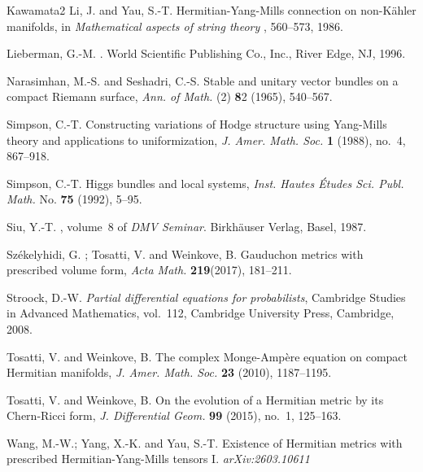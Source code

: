 \documentclass[12pt, reqno]{amsart}
\theoremstyle{plain}
\theoremstyle{definition}
\renewcommand{\>}{\rightarrow}
\renewcommand{\>}{\rightarrow}
\numberwithin{equation}{section} %
\begin{document}
\begin{thebibliography}{Kawamata2}
Li, J. and Yau, S.-T.  Hermitian-Yang-Mills connection on non-K\"ahler manifolds, in {\it Mathematical aspects of string theory }, 560--573, 1986.

 Lieberman, G.-M.
    .
    \newblock World Scientific Publishing Co., Inc., River Edge, NJ, 1996.





    Narasimhan, M.-S.  and  Seshadri, C.-S.  Stable and unitary vector bundles on a compact Riemann surface,  \emph{Ann. of Math.} (2) {\textbf 82} (1965), 540--567.




     Simpson, C.-T.  Constructing variations of Hodge structure using Yang-Mills theory and applications to uniformization, \emph{J. Amer. Math. Soc.} {\textbf 1} (1988), no.~4, 867--918.

     Simpson, C.-T.  Higgs bundles and local systems,  \emph{Inst. Hautes \'Etudes Sci. Publ. Math.} No. \textbf{75} (1992), 5--95.




Siu, Y.-T.
    , volume~8 of {\em DMV Seminar}.
    \newblock Birkh\"auser Verlag, Basel, 1987.


    Sz\'ekelyhidi, G. ; Tosatti, V. and Weinkove, B. Gauduchon metrics with prescribed volume form,  \emph{Acta Math.} \textbf{219}(2017), 181--211.

    Stroock, D.-W. \emph{Partial differential equations for probabilists}, Cambridge Studies in Advanced Mathematics, vol.~112, Cambridge University Press, Cambridge, 2008.






     Tosatti, V.  and Weinkove, B.  The complex Monge-Amp\`ere equation on compact Hermitian manifolds, \emph{J. Amer. Math. Soc.} \textbf{23} (2010), 1187--1195.

 Tosatti, V.  and Weinkove, B.   On the evolution of a Hermitian metric by its Chern-Ricci form, \emph{J. Differential Geom.} {\bf 99} (2015), no.~1, 125--163.

     Wang, M.-W.; Yang, X.-K.  and Yau, S.-T. Existence of Hermitian metrics  with  prescribed Hermitian-Yang-Mills tensors  I.  \emph{arXiv:2603.10611}


\end{thebibliography}
\end{document}
